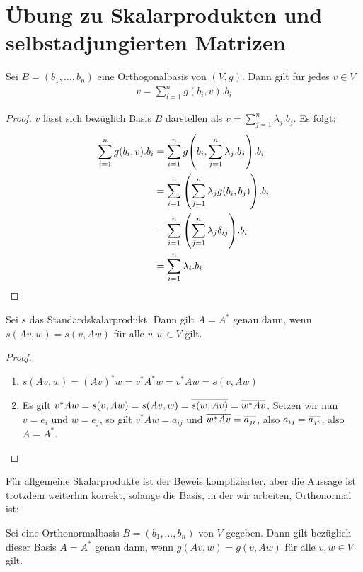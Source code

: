 \documentclass[10pt]{article}
\begin{document}
	\section*{Übung zu Skalarprodukten und selbstadjungierten Matrizen}
	\begin{lemma}
		Sei $B = (b_1, \hdots, b_n)$ eine Orthogonalbasis von $(V,g)$. Dann gilt für jedes $v \in V$
		\begin{align*}
			v = \sum_{i = 1}^n g(b_i,v).b_i
		\end{align*}
	\end{lemma}
	\begin{proof}
		$v$ lässt sich bezüglich Basis $B$ darstellen als $v = \sum_{j = 1}^n \lambda_j.b_j$. Es folgt:
		\begin{align*}
			\sum_{i = 1}^n g(b_i,v).b_i
			&=
			\sum_{i = 1}^n g\qty(b_i,\sum_{j = 1}^n \lambda_j.b_j).b_i\\
			&=
			\sum_{i = 1}^n \qty(\sum_{j = 1}^n \lambda_j g\qty(b_i,b_j)).b_i\\
			&=
			\sum_{i = 1}^n \qty(\sum_{j = 1}^n \lambda_j \delta_{ij}).b_i\\
			&=
			\sum_{i = 1}^n \lambda_i.b_i
		\end{align*}
	\end{proof}
	\begin{theorem}
		Sei $s$ das Standardskalarprodukt. Dann gilt $A = A^*$ genau dann, wenn $s(Av,w) = s(v,Aw)$ für alle $v,w \in V$ gilt.
	\end{theorem}
	\begin{proof}
		\begin{enumerate}
			\item[$\Rightarrow$] $s(Av,w) = (Av)^* w = v^* A^*w = v^*Aw = s(v,Aw)$
			\item[$\Leftarrow$] Es gilt $v^* A w = s(v,Aw) = s(Av,w) = \overline{{s(w,Av)}} = \overline{{w^* Av}}$. Setzen wir nun $v = e_i$ und $w = e_j$, so gilt $v^*Aw = a_{ij}$ und $\overline{{w^* Av}} = \overline{{a_{ji}}}$, also $a_{ij} = \overline{{a_{ji}}}$, also $A = A^*$.
		\end{enumerate}
	\end{proof}
	Für allgemeine  Skalarprodukte ist der Beweis komplizierter, aber die Aussage ist trotzdem weiterhin korrekt, solange die Basis, in der wir arbeiten, Orthonormal ist:
	\begin{theorem}
		Sei eine Orthonormalbasis $B = (b_1, \hdots, b_n)$ von $V$ gegeben. Dann gilt bezüglich dieser Basis $A = A^*$ genau dann, wenn $g(Av, w) = g(v, Aw)$ für alle $v,w \in V$ gilt.
	\end{theorem}
\end{document}
